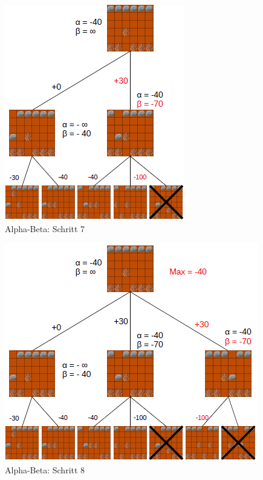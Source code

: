 \begin{figure}[h]
	\centering
	\includegraphics{img/ab7}
	\caption{Alpha-Beta: Schritt 7}
	\label{fig:ab7}
\end{figure}
\begin{figure}[h]
	\centering
	\includegraphics{img/ab8}
	\caption{Alpha-Beta: Schritt 8}
	\label{fig:ab8}
\end{figure}



